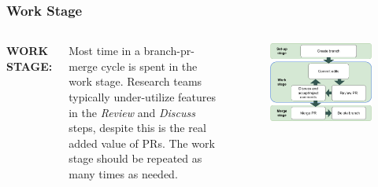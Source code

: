 \documentclass[aspectratio=169]{beamer} %
\begin{document}
\begin{frame}
	\frametitle{Work Stage}
	\begin{columns}[c]
		
		
		\Large \textbf{WORK STAGE:}
		\vspace{.8em}
		
		\normalsize
		Most time in a branch-pr-merge cycle is spent in the work stage.
		\vspace{.5cm}\newline
		Research teams typically under-utilize features 
		in the \textit{Review} and \textit{Discuss} steps, 
		despite this is the real added value of PRs.\vspace{.5cm}\newline
		The work stage should be repeated as many times as needed.
		
		\vspace{-.75cm}
		\begin{figure}
			\centering
			\includegraphics[width=\textwidth]{./img/branch-pr-merge-cycle-S2.png}
		\end{figure}
		
	\end{columns}
\end{frame}
\end{document}

